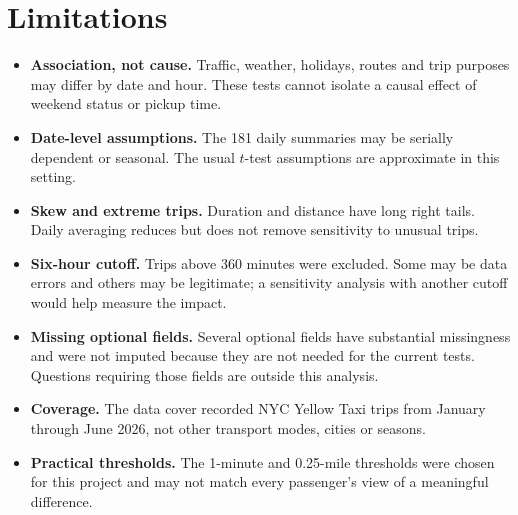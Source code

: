 \documentclass[10pt,a4paper]{article}
\begin{document}
\section{Limitations}
\begin{itemize}
\item \textbf{Association, not cause.} Traffic, weather, holidays, routes and trip purposes may differ by date and hour. These tests cannot isolate a causal effect of weekend status or pickup time.
\item \textbf{Date-level assumptions.} The 181 daily summaries may be serially dependent or seasonal. The usual $t$-test assumptions are approximate in this setting.
\item \textbf{Skew and extreme trips.} Duration and distance have long right tails. Daily averaging reduces but does not remove sensitivity to unusual trips.
\item \textbf{Six-hour cutoff.} Trips above 360 minutes were excluded. Some may be data errors and others may be legitimate; a sensitivity analysis with another cutoff would help measure the impact.
\item \textbf{Missing optional fields.} Several optional fields have substantial missingness and were not imputed because they are not needed for the current tests. Questions requiring those fields are outside this analysis.
\item \textbf{Coverage.} The data cover recorded NYC Yellow Taxi trips from January through June 2026, not other transport modes, cities or seasons.
\item \textbf{Practical thresholds.} The 1-minute and 0.25-mile thresholds were chosen for this project and may not match every passenger's view of a meaningful difference.
\end{itemize}

\clearpage
\onecolumn
\end{document}
